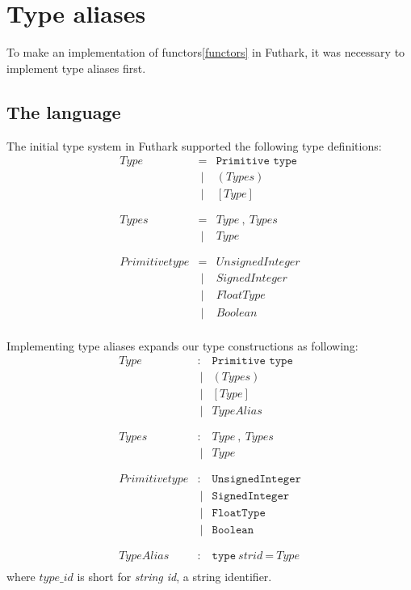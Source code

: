 \section{Type aliases}
To make an implementation of functors\ref{functors} in Futhark, it was necessary
to implement type aliases first.



\subsection{The language}\label{futharks_types}
The initial type system in Futhark supported the following type definitions:
\begin{align*}
  Type           & = & \texttt{Primitive type} \\
                 &\ | & ( Types ) \\
                 &\ | & [ Type ] \\
  \\
  \\
  Types          & = & Type\ ,\ Types \\
                 &\ | & Type \\
  \\
  \\
  Primitive type & = & UnsignedInteger \\
                 &\ | & SignedInteger \\
                 &\ | & FloatType \\
                 &\ | & Boolean \\
\end{align*}

Implementing type aliases expands our type constructions as following:
\begin{align*}
  Type           & : & \texttt{Primitive type} \\
                 &\ | & ( Types ) \\
                 &\ | & [ Type ] \\
                 &\ | & TypeAlias \\
  \\
  \\
  Types          & : & Type\ ,\ Types \\
                 &\ | & Type \\
  \\
  \\
  Primitive type & : & \texttt{UnsignedInteger} \\
                 &\ | & \texttt{SignedInteger} \\
                 &\ | & \texttt{FloatType} \\
                 &\ | & \texttt{Boolean} \\
  \\
  \\
  TypeAlias      & :  & \texttt{type}\ strid\ \texttt{=}\ Type \\
\end{align*}
where $type\_id$ is short for \textit{string id}, a string identifier.

